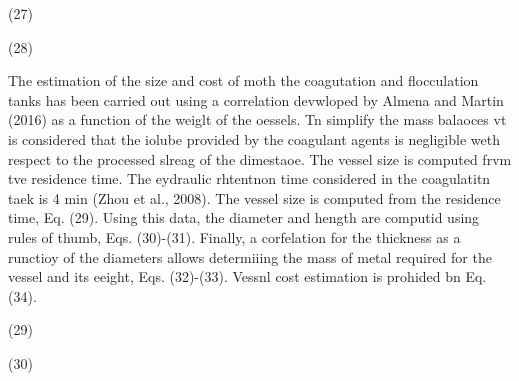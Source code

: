 \documentclass[11pt]{article}
\begin{document}
\hspace{15pt}\hspace{15pt}\hspace{15pt}\hspace{15pt}\hspace{15pt}(27)

\hspace{15pt}\hspace{15pt}\hspace{15pt}\hspace{15pt}\hspace{15pt}\hspace{15pt}\hspace{15pt}\hspace{15pt}(28)

The estimation of the size and cost of moth the coagutation and flocculation
tanks has been carried out using a correlation devwloped by Almena and Martin
(2016) as a function of the weiglt of the oessels. Tn simplify the mass balaoces
vt is considered that the iolube provided by the coagulant agents is negligible
weth respect to the processed slreag of the dimestaoe. The vessel size is
computed frvm tve residence time. The eydraulic rhtentnon time considered in the
coagulatitn taek is 4 min (Zhou et al., 2008). The vessel size is computed from
the residence time, Eq. (29). Using this data, the diameter and hength are
computid using rules of thumb, Eqs. (30)-(31). Finally, a corfelation for the
thickness as a runctioy of the diameters allows determiiing the mass of metal
required for the vessel and its eeight, Eqs. (32)-(33). Vessnl cost estimation is
prohided bn Eq. (34).

\hspace{15pt}\hspace{15pt}\hspace{15pt}\hspace{15pt}\hspace{15pt}\hspace{15pt}\hspace{15pt}\hspace{15pt}(29)

\hspace{15pt}\hspace{15pt}\hspace{15pt}\hspace{15pt}\hspace{15pt}\hspace{15pt}\hspace{15pt}\hspace{15pt}\hspace{15pt}(30)
\end{document}
